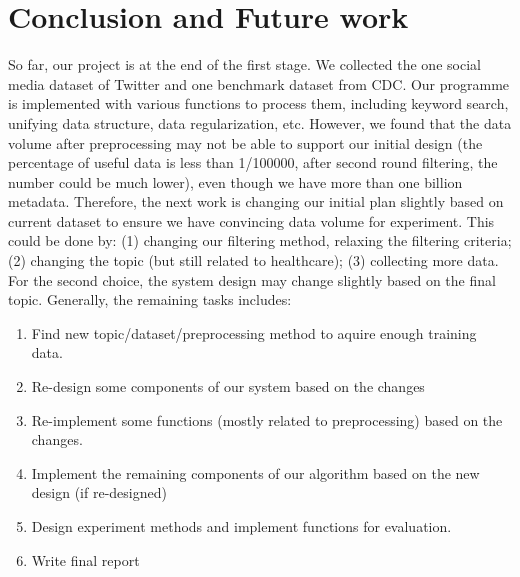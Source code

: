 \section{Conclusion and Future work}
So far, our project is at the end of the first stage. We collected the one social media dataset of Twitter and one benchmark dataset from CDC. Our programme is implemented with various functions to process them, including keyword search, unifying data structure, data regularization, etc. However, we found that the data volume after preprocessing may not be able to support our initial design (the percentage of useful data is less than 1/100000, after second round filtering, the number could be much lower), even though we have more than one billion metadata. Therefore, the next work is changing our initial plan slightly based on current dataset to ensure we have convincing data volume for experiment. This could be done by: (1) changing our filtering method, relaxing the filtering criteria; (2) changing the topic (but still related to healthcare); (3) collecting more data. For the second choice, the system design may change slightly based on the final topic. Generally, the remaining tasks includes:
\begin{enumerate}
    \item Find new topic/dataset/preprocessing method to aquire enough training data.
    \item Re-design some components of our system based on the changes
    \item Re-implement some functions (mostly related to preprocessing) based on the changes.
    \item Implement the remaining components of our algorithm based on the new design (if re-designed)
    \item Design experiment methods and implement functions for evaluation.
    \item Write final report
\end{enumerate}